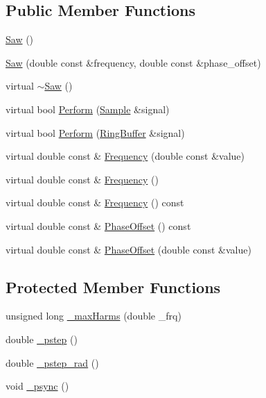 \subsection*{Public Member Functions}
\begin{DoxyCompactItemize}
\item 
\hyperlink{classSignal_1_1Fourier_1_1Saw_ae91605981e8c08c9e65eefb7d9d5b13f}{Saw} ()
\item 
\hyperlink{classSignal_1_1Fourier_1_1Saw_aab83de6d87180afbd96416ae3ccd524d}{Saw} (double const \&frequency, double const \&phase\+\_\+offset)
\item 
virtual \hyperlink{classSignal_1_1Fourier_1_1Saw_aa5529baeec45ec08ee038f761e18a263}{$\sim$\+Saw} ()
\item 
virtual bool \hyperlink{classSignal_1_1Fourier_1_1Saw_adf69eea95516fc9c7d06fae036d2fa9b}{Perform} (\hyperlink{classSignal_1_1Sample}{Sample} \&signal)
\item 
virtual bool \hyperlink{classSignal_1_1Fourier_1_1Saw_acef099db2217902d7157e5b93f658363}{Perform} (\hyperlink{classSignal_1_1RingBuffer}{Ring\+Buffer} \&signal)
\item 
virtual double const \& \hyperlink{classSignal_1_1Fourier_1_1Saw_a398a26142f42cdc5cb33230e9ab05b9d}{Frequency} (double const \&value)
\item 
virtual double const \& \hyperlink{classSignal_1_1Fourier_1_1Saw_ac043dbd87268aae7e203ab0d67bbdb5c}{Frequency} ()
\item 
virtual double const \& \hyperlink{classSignal_1_1SignalGenerator_a96af42ee68f94e9b04d034fd68b73ecd}{Frequency} () const 
\item 
virtual double const \& \hyperlink{classSignal_1_1SignalGenerator_ac2538ec946f001e394d2416fda698d1c}{Phase\+Offset} () const 
\item 
virtual double const \& \hyperlink{classSignal_1_1SignalGenerator_ac6a103ff72beaa338f6d18c812522d78}{Phase\+Offset} (double const \&value)
\end{DoxyCompactItemize}
\subsection*{Protected Member Functions}
\begin{DoxyCompactItemize}
\item 
unsigned long \hyperlink{classSignal_1_1Fourier_1_1FourierGenerator_a99720416bd9ff96636f4acf956a785d5}{\+\_\+max\+Harms} (double \+\_\+frq)
\item 
double \hyperlink{classSignal_1_1SignalGenerator_a43b0eec84ee7df04c947533c0511c2c0}{\+\_\+pstep} ()
\item 
double \hyperlink{classSignal_1_1SignalGenerator_abf2f4ab977c6e84bf85022eab8135304}{\+\_\+pstep\+\_\+rad} ()
\item 
void \hyperlink{classSignal_1_1SignalGenerator_a563f57d4dfd8728a6a572f15c1e2532b}{\+\_\+psync} ()
\end{DoxyCompactItemize}

